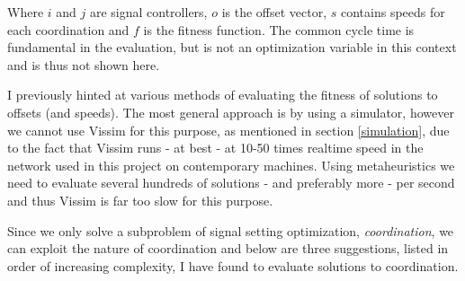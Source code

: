 Where $i$ and $j$ are signal controllers, $o$ is the offset vector, $s$ contains speeds for each coordination and $f$ is the fitness function. The common cycle time is fundamental in the evaluation, but is not an optimization variable in this context and is thus not shown here.

I previously hinted at various methods of evaluating the fitness of solutions to offsets (and speeds). The most general approach is by using a simulator, however we cannot use Vissim for this purpose, as mentioned in section \ref{simulation}, due to the fact that Vissim runs - at best - at 10-50 times realtime speed in the network used in this project on contemporary machines. Using metaheuristics we need to evaluate several hundreds of solutions - and preferably more - per second and thus Vissim is far too slow for this purpose.

Since we only solve a subproblem of signal setting optimization, \textit{coordination}, we can exploit the nature of coordination and below are three suggestions, listed in order of increasing complexity, I have found to evaluate solutions to coordination.

